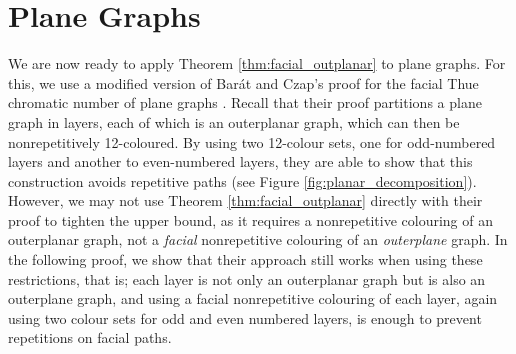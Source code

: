 \documentclass{patmorin}
\begin{document}
\section{Plane Graphs}
\label{sec:facial_plane}

We are now ready to apply Theorem \ref{thm:facial_outplanar} to plane graphs. For this, we use a modified version of Bar{\'a}t and Czap's proof for the facial Thue chromatic number of plane graphs \cite{barat2013facial}. Recall that their proof partitions a plane graph in layers, each of which is an outerplanar graph, which can then be nonrepetitively 12-coloured. By using two 12-colour sets, one for odd-numbered layers and another to even-numbered layers, they are able to show that this construction avoids repetitive paths (see Figure \ref{fig:planar_decomposition}). However, we may not use Theorem \ref{thm:facial_outplanar} directly with their proof to tighten the upper bound, as it requires a nonrepetitive colouring of an outerplanar graph, not a \emph{facial} nonrepetitive colouring of an \emph{outerplane} graph. In the following proof, we show that their approach still works when using these restrictions, that is; each layer is not only an outerplanar graph but is also an outerplane graph, and using a facial nonrepetitive colouring of each layer, again using two colour sets for odd and even numbered layers, is enough to prevent repetitions on facial paths.
\end{document}
